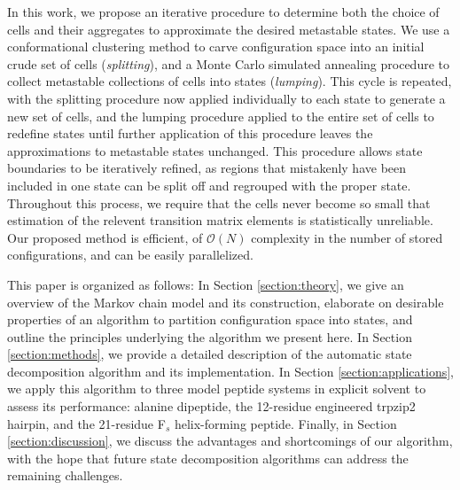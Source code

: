 In this work, we propose an iterative procedure to determine both the choice of cells and their aggregates to approximate the desired metastable states.
We use a conformational clustering method to carve configuration space into an initial crude set of cells (\emph{splitting}), and a Monte Carlo simulated annealing procedure to collect metastable collections of cells into states (\emph{lumping}).
This cycle is repeated, with the splitting procedure now applied individually to each state to generate a new set of cells, and the lumping procedure applied to the entire set of cells to redefine states until further application of this procedure leaves the approximations to metastable states unchanged.
This procedure allows state boundaries to be iteratively refined, as regions that mistakenly have been included in one state can be split off and regrouped with the proper state.
Throughout this process, we require that the cells never become so small that estimation of the relevent transition matrix elements is statistically unreliable.
Our proposed method is efficient, of $\mathcal{O}(N)$ complexity in the number of stored configurations, and can be easily parallelized.

This paper is organized as follows:
In Section \ref{section:theory}, we give an overview of the Markov chain model and its construction, elaborate on desirable properties of an algorithm to partition configuration space into states, and outline the principles underlying the algorithm we present here.
In Section \ref{section:methods}, we provide a detailed description of the automatic state decomposition algorithm and its implementation.
In Section \ref{section:applications}, we apply this algorithm to three model peptide systems in explicit solvent to assess its performance: alanine dipeptide, the 12-residue engineered trpzip2 hairpin, and the 21-residue F$_s$ helix-forming peptide.
Finally, in Section \ref{section:discussion}, we discuss the advantages and shortcomings of our algorithm, with the hope that future state decomposition algorithms can address the remaining challenges.
